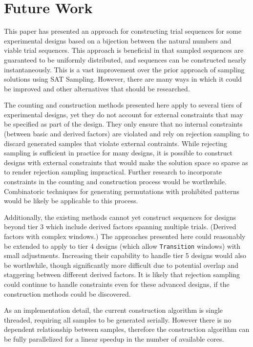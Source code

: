 
\chapter{Future Work}

This paper has presented an approach for constructing trial sequences for some experimental designs based on a bijection between the natural numbers and viable trial sequences. This approach is beneficial in that sampled sequences are guaranteed to be uniformly distributed, and sequences can be constructed nearly instantaneously. This is a vast improvement over  the prior approach of sampling solutions using SAT Sampling. However, there are many ways in which it could be improved and other alternatives that should be researched.

The counting and construction methods presented here apply to several tiers of experimental designs, yet they do not account for external constraints that may be specified as part of the design. They only ensure that no internal constraints (between basic and derived factors) are violated and rely on rejection sampling to discard generated samples that violate external contraints. While rejecting sampling is sufficient in practice for many designs, it is possible to construct designs with external constraints that would make the solution space so sparse as to render rejection sampling impractical. Further research to incorporate constraints in the counting and construction process would be worthwhile. Combinatoric techniques for generating permutations with prohibited patterns would be likely be applicable to this process.

Additionally, the existing methods cannot yet construct sequences for designs beyond tier 3 which include derived factors spanning multiple trials. (Derived factors with complex windows.) The approaches presented here could reasonably be extended to apply to tier 4 designs (which allow \texttt{Transition} windows) with small adjustments. Increasing their capability to handle tier 5 designs would also be worthwhile, though significantly more difficult due to potential overlap and staggering between different derived factors. It is likely that rejection sampling could continue to handle constraints even for these advanced designs, if the construction methods could be discovered.

As an implementation detail, the current construction algorithm is single threaded, requiring all samples to be generated serially. However there is no dependent relationship between samples, therefore the construction algorithm can be fully parallelized for a linear speedup in the number of available cores.

